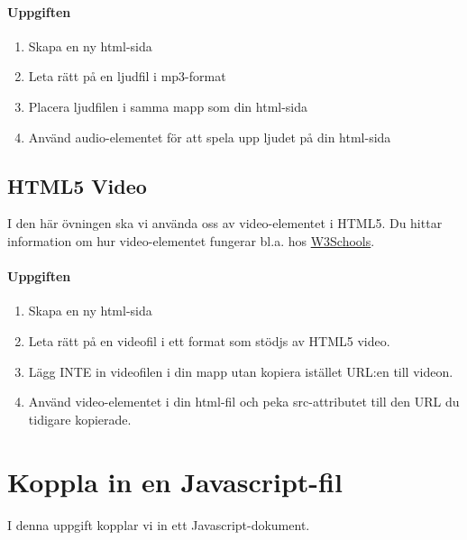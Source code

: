 \documentclass{article}
\begin{document}
    \paragraph{Uppgiften}
      \begin{enumerate}
        \item Skapa en ny html-sida
        \item Leta rätt på en ljudfil i mp3-format
        \item Placera ljudfilen i samma mapp som din html-sida
        \item Använd audio-elementet för att spela upp ljudet på din html-sida
      \end{enumerate}


  \subsection{ HTML5 Video }
    I den här övningen ska vi använda oss av video-elementet i HTML5. Du hittar information om hur video-elementet fungerar bl.a. hos \href{http://www.w3schools.com/html/html5_video.asp}{W3Schools}.

    \paragraph{Uppgiften}
      \begin{enumerate}
        \item Skapa en ny html-sida
        \item Leta rätt på en videofil i ett format som stödjs av HTML5 video.
        \item Lägg INTE in videofilen i din mapp utan kopiera istället URL:en till videon.
        \item Använd video-elementet i din html-fil och peka src-attributet till den URL du tidigare kopierade.
      \end{enumerate}



\newpage
\section{ Koppla in en Javascript-fil }
\paragraph{}
I denna uppgift kopplar vi in ett Javascript-dokument.
\end{document}
